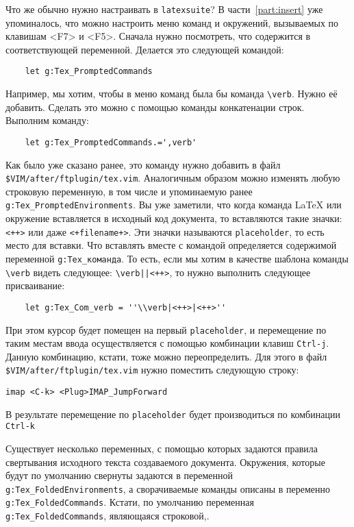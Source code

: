 \documentclass[a4paper]{article}
\begin{document}
Что же обычно нужно настраивать в \texttt{latexsuite}? В части~\ref{part:insert} уже упоминалось, что 
можно настроить меню команд и окружений, вызываемых по клавишам <F7> и <F5>. Сначала нужно посмотреть,
что содержится в соответствующей переменной. Делается это следующей командой:
\begin{verbatim}
	let g:Tex_PromptedCommands
\end{verbatim}
Например, мы хотим, чтобы в меню команд была бы команда \verb|\verb|. Нужно её добавить. Сделать
это можно с помощью команды конкатенации строк. Выполним команду:
\begin{verbatim}
	let g:Tex_PromptedCommands.=',verb'
\end{verbatim}
Как было уже сказано ранее, это команду нужно добавить в файл \verb|$VIM/after/ftplugin/tex.vim|.
Аналогичным образом можно изменять любую строковую переменную, в том числе и упоминаемую ранее
\verb|g:Tex_PromptedEnvironments|.
Вы уже заметили, что когда команда \LaTeX{} или окружение вставляется в исходный код документа, 
то вставляются такие значки: \verb|<++>| или даже \verb|<+filename+>|. Эти значки называются 
\texttt{placeholder}, то есть место для вставки. Что вставлять вместе с командой определяется 
содержимой переменной \verb|g:Tex_команда|. То есть, если мы хотим в качестве шаблона команды \verb|\verb| 
видеть следующее: \verb$\verb||<++>$, то нужно выполнить следующее присваивание:
\begin{verbatim}
	let g:Tex_Com_verb = ''\\verb|<++>|<++>''
\end{verbatim}
При этом курсор будет помещен на первый \texttt{placeholder}, и перемещение по таким 
местам ввода осуществляется с помощью комбинации клавиш \texttt{Ctrl-j}. Данную комбинацию,
кстати, тоже можно переопределить. Для этого в файл \verb|$VIM/after/ftplugin/tex.vim| 
нужно поместить следующую строку:
\begin{verbatim}
imap <C-k> <Plug>IMAP_JumpForward
\end{verbatim}
В результате перемещение по \texttt{placeholder} будет производиться по комбинации \texttt{Ctrl-k}

Существует  несколько переменных, с помощью которых задаются правила свертывания исходного текста
создаваемого документа. Окружения, которые будут по умолчанию свернуты задаются в переменной
\verb|g:Tex_FoldedEnvironments|, а сворачиваемые команды описаны в переменно \verb|g:Tex_FoldedCommands|.
Кстати, по умолчанию переменная \verb|g:Tex_FoldedCommands|, являющаяся строковой,.
\end{document}
